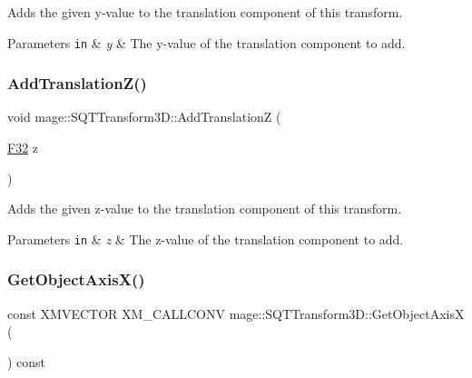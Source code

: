 Adds the given y-\/value to the translation component of this transform.


\begin{DoxyParams}[1]{Parameters}
\mbox{\tt in}  & {\em y} & The y-\/value of the translation component to add. \\
\hline
\end{DoxyParams}
\mbox{\label{classmage_1_1_s_q_t_transform3_d_aa6979b42840eb3ec6e41c580354b9833}} 
\subsubsection{\texorpdfstring{Add\+Translation\+Z()}{AddTranslationZ()}}
{\footnotesize\ttfamily void mage\+::\+S\+Q\+T\+Transform3\+D\+::\+Add\+TranslationZ (\begin{DoxyParamCaption}\item[{\mbox{\hyperlink{namespacemage_aa97e833b45f06d60a0a9c4fc22ae02c0}{F32}}}]{z }\end{DoxyParamCaption})\hspace{0.3cm}{\ttfamily [noexcept]}}

Adds the given z-\/value to the translation component of this transform.


\begin{DoxyParams}[1]{Parameters}
\mbox{\tt in}  & {\em z} & The z-\/value of the translation component to add. \\
\hline
\end{DoxyParams}
\mbox{\label{classmage_1_1_s_q_t_transform3_d_a654bdb773dc082a56bda467ac8baedd5}} 
\subsubsection{\texorpdfstring{Get\+Object\+Axis\+X()}{GetObjectAxisX()}}
{\footnotesize\ttfamily const X\+M\+V\+E\+C\+T\+OR X\+M\+\_\+\+C\+A\+L\+L\+C\+O\+NV mage\+::\+S\+Q\+T\+Transform3\+D\+::\+Get\+Object\+AxisX (\begin{DoxyParamCaption}{ }\end{DoxyParamCaption}) const\hspace{0.3cm}{\ttfamily [noexcept]}}

